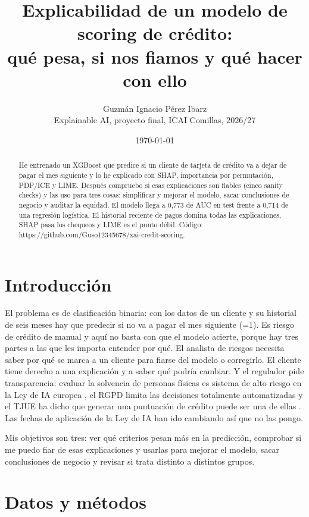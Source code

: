 \documentclass[10pt,a4paper]{article}
\title{Explicabilidad de un modelo de scoring de crédito:\\ qué pesa, si nos fiamos y qué hacer con ello}
\author{Guzmán Ignacio Pérez Ibarz \\ Explainable AI, proyecto final, ICAI Comillas, 2026/27}
\date{\today}
\newcommand{\var}[1]{\texttt{\detokenize{#1}}}
\begin{document}
\maketitle

\begin{abstract}
\noindent He entrenado un XGBoost que predice si un cliente de tarjeta de crédito va a dejar de pagar el mes siguiente y lo he explicado con SHAP, importancia por permutación, PDP/ICE y LIME. Después compruebo si esas explicaciones son fiables (cinco sanity checks) y las uso para tres cosas: simplificar y mejorar el modelo, sacar conclusiones de negocio y auditar la equidad. El modelo llega a 0,773 de AUC en test frente a 0,714 de una regresión logística. El historial reciente de pagos domina todas las explicaciones, SHAP pasa los chequeos y LIME es el punto débil. Código: https://github.com/Guso12345678/xai-credit-scoring.
\end{abstract}

\section{Introducción}
El problema es de clasificación binaria: con los datos de un cliente y su historial de seis meses hay que predecir si no va a pagar el mes siguiente (\var{default}=1). Es riesgo de crédito de manual y aquí no basta con que el modelo acierte, porque hay tres partes a las que les importa entender por qué. El analista de riesgos necesita saber por qué se marca a un cliente para fiarse del modelo o corregirlo. El cliente tiene derecho a una explicación y a saber qué podría cambiar. Y el regulador pide transparencia: evaluar la solvencia de personas físicas es sistema de alto riesgo en la Ley de IA europea \citep{aiact}, el RGPD limita las decisiones totalmente automatizadas \citep{gdpr} y el TJUE ha dicho que generar una puntuación de crédito puede ser una de ellas \citep{schufa}. Las fechas de aplicación de la Ley de IA han ido cambiando así que no las pongo.

Mis objetivos son tres: ver qué criterios pesan más en la predicción, comprobar si me puedo fiar de esas explicaciones y usarlas para mejorar el modelo, sacar conclusiones de negocio y revisar si trata distinto a distintos grupos.

\section{Datos y métodos}
\end{document}
